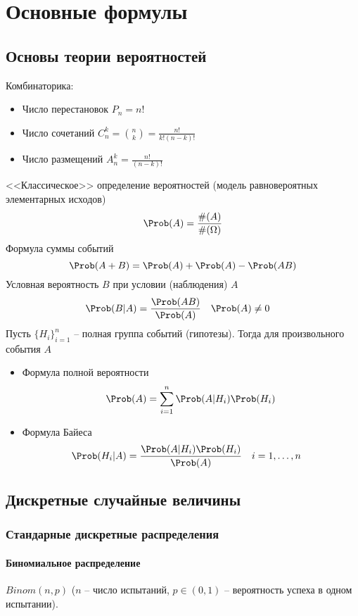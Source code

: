 
\section{Основные формулы}

\subsection{Основы теории вероятностей}

Комбинаторика:
\begin{itemize}
	\item Число перестановок \(P_n=n!\)
	\item Число сочетаний \(C_n^k=\binom{n}{k}=\frac{n!}{k!(n-k)!}\)
	\item Число размещений \(A_n^k=\frac{n!}{(n-k)!}\)
\end{itemize}
<<Классическое>> определение вероятностей (модель равновероятных элементарных исходов)
\[
	\Prob(A)=\frac{\#(A)}{\#(\Omega)}
\]
Формула суммы событий
\[
	\Prob(A+B)=\Prob(A)+\Prob(A)-\Prob(AB)
\]
Условная вероятность \(B\) при условии (наблюдения) \(A\)
\begin{align*}
	\Prob(B|A)&=\frac{\Prob(AB)}{\Prob(A)} & \Prob(A)&\ne0
\end{align*}
Пусть \(\{H_i\}_{i=1}^n\) -- полная группа событий (гипотезы).
Тогда для произвольного события  \(A\)
\begin{itemize}
	\item Формула полной вероятности
	\[
		\Prob(A)=\sum_{i=1}^n \Prob(A|H_i)\Prob(H_i)
	\]
	\item Формула Байеса
	\begin{align*}
		\Prob(H_i|A)&=\frac{\Prob(A|H_i)\Prob(H_i)}{\Prob(A)} &
		i&=1,\ldots,n
	\end{align*}
\end{itemize}

\subsection{Дискретные случайные величины}

\subsubsection{Стандарные дискретные распределения}

\paragraph{Биномиальное распределение} \(Binom(n, p)\) (\(n\) -- число испытаний, 
\(p\in(0,1)\) -- вероятность успеха в одном испытании). 

